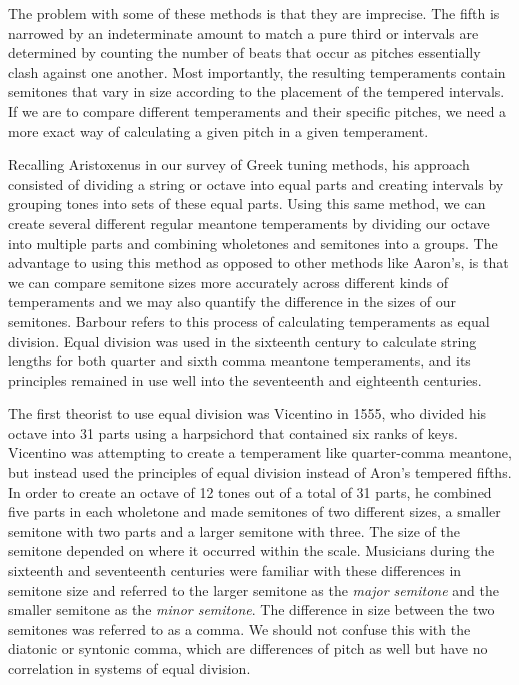 The problem with some of these methods is that they are imprecise. The
fifth is narrowed by an indeterminate amount to match a pure third or
intervals are determined by counting the number of beats that occur as pitches
essentially clash against one another.  Most importantly, the resulting temperaments
contain semitones that vary in size according to the placement of the tempered intervals.
If we are to compare different temperaments and their specific pitches, we need a more
exact way of calculating a given pitch in a given temperament.

Recalling Aristoxenus in our survey of Greek tuning methods, his approach consisted of
dividing a string or octave into equal parts and creating intervals by grouping tones into
sets of these equal parts. Using this same method, we can create several different regular
meantone temperaments by dividing our octave into multiple parts and combining
wholetones and semitones into a groups. The advantage to using this method as
opposed to other methods like Aaron's, is that we can compare semitone sizes more
accurately across different kinds of temperaments and we may also quantify the difference
in the sizes of our semitones. Barbour refers to this process of calculating temperaments
as equal division. Equal division was used in the sixteenth century to calculate string
lengths for both quarter and sixth comma meantone temperaments, and its principles
remained in use well into the seventeenth and eighteenth centuries.

The first theorist to use equal division was Vicentino in 1555, who divided his octave
into 31 parts using a harpsichord that contained six ranks of keys. Vicentino was
attempting to create a temperament like quarter-comma meantone, but instead used the
principles of equal division instead of Aron's tempered fifths. In order to create an
octave of 12 tones out of a total of 31 parts, he combined five parts in each wholetone
and made semitones of two different sizes, a smaller semitone with two
parts and a larger semitone with three.  The size of the semitone depended on where it
occurred within the scale. Musicians during the sixteenth and seventeenth centuries
were familiar with these differences in semitone size and referred to the larger
semitone as the \textit{major semitone} and the smaller semitone as the \textit{minor
semitone}.  The difference in size between the two semitones was referred to as a
comma.  We should not confuse this with the diatonic or syntonic comma, which are
differences of pitch as well but have no correlation in systems of equal division.

